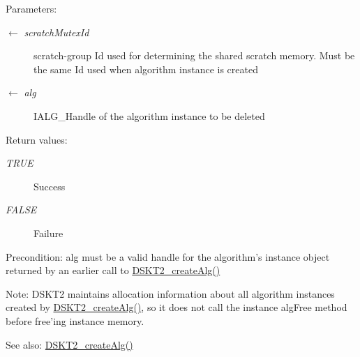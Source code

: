 \begin{Desc}
\item[Parameters:]
\begin{description}
\item[\mbox{$\leftarrow$} {\em scratch\-Mutex\-Id}]scratch-group Id used for determining the shared scratch memory. Must be the same Id used when algorithm instance is created \item[\mbox{$\leftarrow$} {\em alg}]IALG\_\-Handle of the algorithm instance to be deleted\end{description}
\end{Desc}
\begin{Desc}
\item[Return values:]
\begin{description}
\item[{\em TRUE}]Success \item[{\em FALSE}]Failure\end{description}
\end{Desc}
\begin{Desc}
\item[Precondition:]alg must be a valid handle for the algorithm's instance object returned by an earlier call to \hyperlink{group___d_s_p_d_s_k_t2_g5528d73c34724bc310404da0dc2fbd69}{DSKT2\_\-create\-Alg()}\end{Desc}
\begin{Desc}
\item[Note:]DSKT2 maintains allocation information about all algorithm instances created by \hyperlink{group___d_s_p_d_s_k_t2_g5528d73c34724bc310404da0dc2fbd69}{DSKT2\_\-create\-Alg()}, so it does not call the instance alg\-Free method before free'ing instance memory.\end{Desc}
\begin{Desc}
\item[See also:]\hyperlink{group___d_s_p_d_s_k_t2_g5528d73c34724bc310404da0dc2fbd69}{DSKT2\_\-create\-Alg()} \end{Desc}
